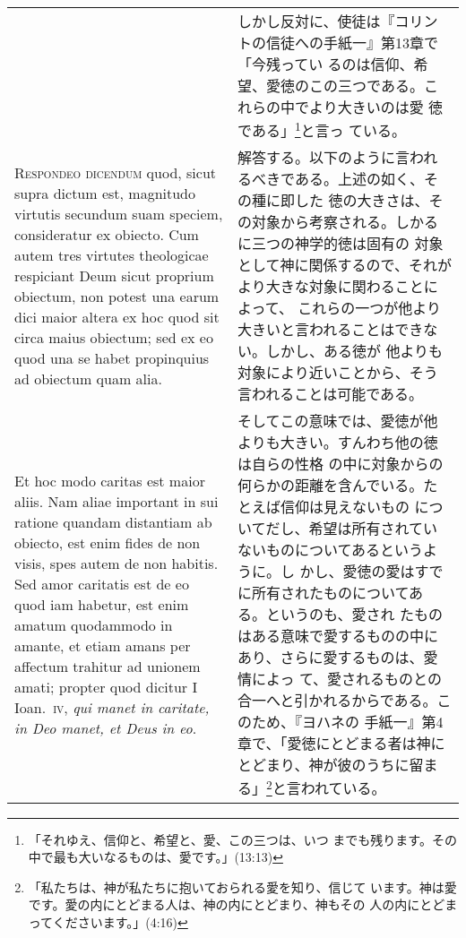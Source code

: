 \documentclass[10pt]{jsarticle}
\begin{document}
\begin{longtable}{p{21em}p{21em}}
 &

 しかし反対に、使徒は『コリントの信徒への手紙一』第13章で「今残ってい
 るのは信仰、希望、愛徳のこの三つである。これらの中でより大きいのは愛
 徳である」\footnote{「それゆえ、信仰と、希望と、愛、この三つは、いつ
 までも残ります。その中で最も大いなるものは、愛です。」(13:13)}と言っ
 ている。

 \\


 {\scshape Respondeo dicendum} quod, sicut supra dictum est, magnitudo
 virtutis secundum suam speciem, consideratur ex obiecto. Cum autem
 tres virtutes theologicae respiciant Deum sicut proprium obiectum,
 non potest una earum dici maior altera ex hoc quod sit circa maius
 obiectum; sed ex eo quod una se habet propinquius ad obiectum quam
 alia.


 &

 解答する。以下のように言われるべきである。上述の如く、その種に即した
 徳の大きさは、その対象から考察される。しかるに三つの神学的徳は固有の
 対象として神に関係するので、それがより大きな対象に関わることによって、
 これらの一つが他より大きいと言われることはできない。しかし、ある徳が
 他よりも対象により近いことから、そう言われることは可能である。
 

 \\


 Et hoc modo caritas est maior aliis. Nam aliae important in sui
 ratione quandam distantiam ab obiecto, est enim fides de non visis,
 spes autem de non habitis. Sed amor caritatis est de eo quod iam
 habetur, est enim amatum quodammodo in amante, et etiam amans per
 affectum trahitur ad unionem amati; propter quod dicitur I
 Ioan.~{\scshape iv}, {\itshape qui manet in caritate, in Deo manet,
 et Deus in eo}.

 &

 そしてこの意味では、愛徳が他よりも大きい。すんわち他の徳は自らの性格
 の中に対象からの何らかの距離を含んでいる。たとえば信仰は見えないもの
 についてだし、希望は所有されていないものについてあるというように。し
 かし、愛徳の愛はすでに所有されたものについてある。というのも、愛され
 たものはある意味で愛するものの中にあり、さらに愛するものは、愛情によっ
 て、愛されるものとの合一へと引かれるからである。このため、『ヨハネの
 手紙一』第4章で、「愛徳にとどまる者は神にとどまり、神が彼のうちに留ま
 る」\footnote{「私たちは、神が私たちに抱いておられる愛を知り、信じて
 います。神は愛です。愛の内にとどまる人は、神の内にとどまり、神もその
 人の内にとどまってくださいます。」(4:16)}と言われている。


\end{longtable}
\end{document}
